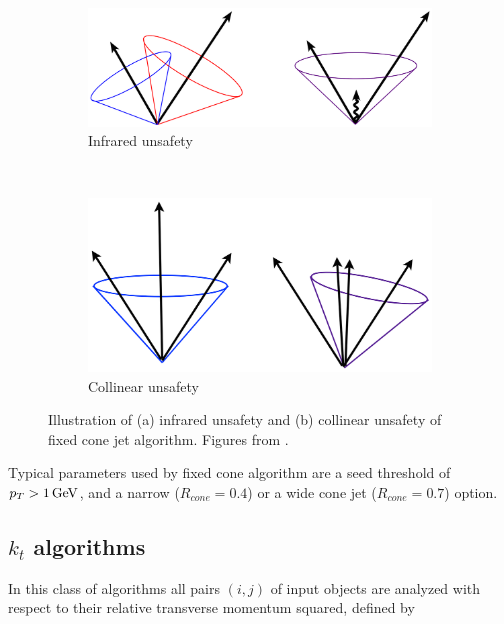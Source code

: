 \begin{figure}[t]
  \centering
  \begin{subfigure}[b]{0.65\textwidth}
    \includegraphics[width=\textwidth]{Chapter2/IRsafety.png}
    \caption{Infrared unsafety}
    \label{fig:IRsafety}
  \end{subfigure}
  ~
  \begin{subfigure}[b]{0.6\textwidth}
    \includegraphics[width=\textwidth]{Chapter2/ColSafety.png}
    \caption{Collinear unsafety}
    \label{fig:ColSafety}
  \end{subfigure}
  \caption[Illustration of (a) infrared unsafety and (b) collinear unsafety
          of fixed cone jet algorithm.]
          {Illustration of (a) infrared unsafety and (b) collinear unsafety
          of fixed cone jet algorithm.
          Figures from \cite{JetTheoreticalPictures}.}
  \label{fig:JetIRCOLsafety}
\end{figure}

Typical parameters used by fixed cone algorithm are a seed threshold of $p_{T} > 1 \,\text{GeV}$,
and a narrow ($R_{cone} = 0.4$) or a wide cone jet ($R_{cone} = 0.7$) option.

\subsection{$k_t$ algorithms}

In this class of algorithms all pairs $(i,j)$ of input objects are analyzed with
respect to their relative transverse momentum squared, defined by 


